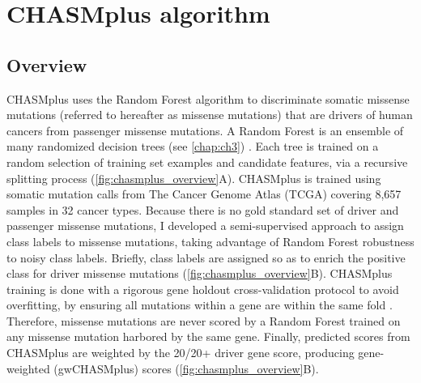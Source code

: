\section{CHASMplus algorithm}

\subsection{Overview}
CHASMplus uses the Random Forest algorithm to discriminate somatic missense mutations (referred to hereafter as missense mutations) that are drivers of human cancers from passenger missense mutations. A Random Forest is an ensemble of many randomized decision trees (see \autoref{chap:ch3}) \cite{RN41, RN40}. Each tree is trained on a random selection of training set examples and candidate features, via a recursive splitting process \cite{RN89}(\autoref{fig:chasmplus_overview}A). CHASMplus is trained using somatic mutation calls from The Cancer Genome Atlas (TCGA) covering 8,657 samples in 32 cancer types.  Because there is no gold standard set of driver and passenger missense mutations, I developed a semi-supervised approach to assign class labels to missense mutations, taking advantage of Random Forest robustness to noisy class labels.  Briefly, class labels are assigned so as to enrich the positive class for driver missense mutations (\autoref{fig:chasmplus_overview}B). CHASMplus training is done with a rigorous gene holdout cross-validation protocol to avoid overfitting, by ensuring all mutations within a gene are within the same fold \cite{RN128, RN137}. Therefore, missense mutations are never scored by a Random Forest trained on any missense mutation harbored by the same gene.  Finally, predicted scores from CHASMplus are weighted by the 20/20+ driver gene score, producing gene-weighted (gwCHASMplus) scores (\autoref{fig:chasmplus_overview}B).

